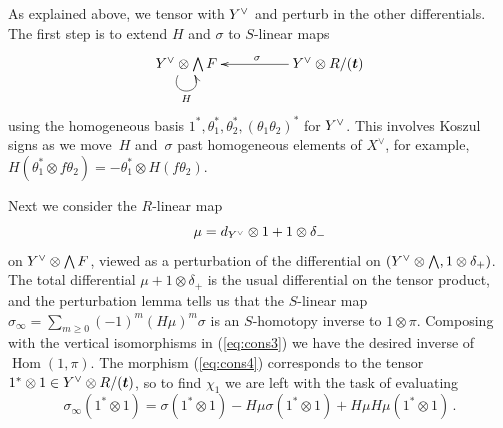\documentclass{compositio}
\theoremstyle{definition}
\numberwithin{equation}{section}
\def\Hom{\operatorname{Hom}}
\begin{document}
As explained above, we tensor with $Y^{\vee}$ and perturb in the other differentials. The first step is to extend $H$ and $\sigma$ to $S$-linear maps
\[
\xymatrix@C+2pc{
Y\mdual \otimes \bigwedge F \ar@(dl,dr)[]_{H} & Y\mdual \otimes R/(\boldsymbol{t}) \ar[l]_{\sigma}
}
\]
using the homogeneous basis $1^*, \theta_1^*, \theta_2^*, (\theta_1\theta_2)^*$ for $Y^{\vee}$. This involves Koszul signs as we move~$H$ and~$\sigma$ past homogeneous elements of $X^{\lor}$, for example, $H(\theta_1^* \otimes f \theta_2) = - \theta_1^* \otimes H(f \theta_2)$. 

Next we consider the $R$-linear map
\[
\mu = d_{Y^{\vee}} \otimes 1 + 1 \otimes \delta_{-}
\]
on $Y^{\vee} \otimes \bigwedge F$, viewed as a perturbation of the differential on $(Y^{\vee} \otimes \bigwedge, 1 \otimes \delta_{+})$. The total differential $\mu + 1 \otimes \delta_{+}$ is the usual differential on the tensor product, and the perturbation lemma tells us that the $S$-linear map $\sigma_\infty = \sum_{m \ge 0} (-1)^m (H \mu)^m \sigma$ is an $S$-homotopy inverse to $1 \otimes \pi$. Composing with the vertical isomorphisms in (\ref{eq:cons3}) we have the desired inverse of $\Hom(1,\pi)$. The morphism (\ref{eq:cons4}) corresponds to the tensor $1^* \otimes 1 \in Y^{\vee} \otimes R/(\boldsymbol{t})$, so to find $\chi_1$ we are left with the task of evaluating
\[
\sigma_\infty(1^* \otimes 1) = \sigma(1^* \otimes 1) - H \mu \sigma(1^* \otimes 1) + H \mu H \mu(1^* \otimes 1) \, .
\]
\end{document}

